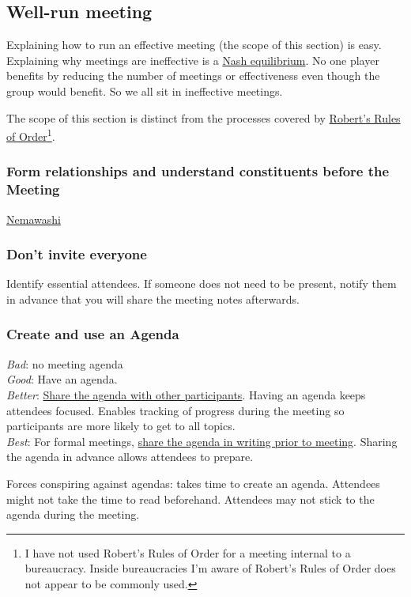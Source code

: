 \subsection{Well-run meeting\label{well-run_meeting}}

Explaining how to run an effective meeting (the scope of this section) is easy. Explaining why meetings are ineffective is a \href{https://en.wikipedia.org/wiki/Nash_equilibrium}{Nash equilibrium}. No one player benefits by reducing the number of meetings or effectiveness even though the group would benefit. So we all sit in ineffective meetings. 

The scope of this section is distinct from the processes covered by \href{https://en.wikipedia.org/wiki/Robert\%27s_Rules_of_Order}{Robert's Rules of Order}\footnote{I have not used Robert's Rules of Order for a meeting internal to a bureaucracy. Inside bureaucracies I'm aware of Robert's Rules of Order does not appear to be commonly used.}. 

\subsubsection{Form relationships and understand constituents before the Meeting}

\href{https://en.wikipedia.org/wiki/Nemawashi}{Nemawashi}

\subsubsection{Don't invite everyone}
Identify essential attendees. If someone does not need to be present, notify them in advance that you will share the meeting notes afterwards. 

\subsubsection{Create and use an Agenda}
\textit{Bad}: no meeting agenda\\
\textit{Good}: Have an agenda. \\
\textit{Better}: \underline{Share the agenda with other participants}. Having an agenda keeps attendees focused.  Enables tracking of progress during the meeting so participants are more likely to get to all topics.\\
\textit{Best}: For formal meetings, \underline{share the agenda in writing prior to meeting}. Sharing the agenda in advance allows attendees to prepare.

Forces conspiring against agendas: takes time to create an agenda. Attendees might not take the time to read beforehand. Attendees may not stick to the agenda during the meeting.

